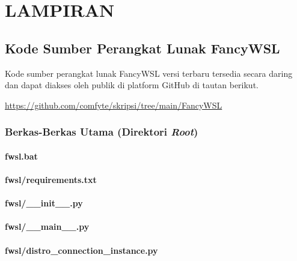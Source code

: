 \chapter*{LAMPIRAN}
\section{Kode Sumber Perangkat Lunak FancyWSL}

Kode sumber perangkat lunak FancyWSL versi terbaru tersedia secara daring dan dapat diakses oleh publik di platform GitHub di tautan berikut.

\href{https://github.com/comfyte/skripsi/tree/main/FancyWSL}{https://github.com/comfyte/skripsi/tree/main/FancyWSL}


\subsection{Berkas-Berkas Utama (Direktori \textit{Root})}

\subsubsection{fwsl.bat}


\subsubsection{fwsl/requirements.txt}


\subsubsection{fwsl/\_\_init\_\_.py}


\subsubsection{fwsl/\_\_main\_\_.py}


\subsubsection{fwsl/distro\_connection\_instance.py}


